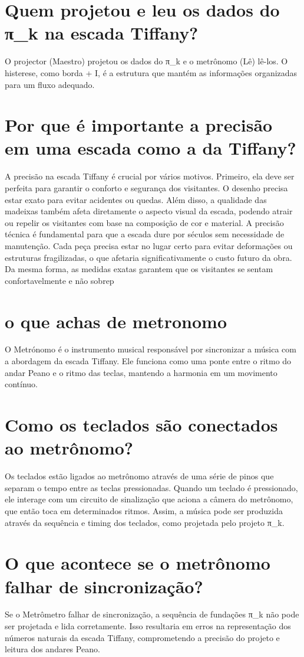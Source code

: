 \documentclass[11pt,a4paper]{article}
\begin{document}
\section{Quem projetou e leu os dados do π\_k na escada Tiffany?}
O projector (Maestro) projetou os dados do π\_k e o metrônomo (Lê) lê-los. O histerese, como borda + I, é a estrutura que mantém as informações organizadas para um fluxo adequado.

\section{Por que é importante a precisão em uma escada como a da Tiffany?}
A precisão na escada Tiffany é crucial por vários motivos. Primeiro, ela deve ser perfeita para garantir o conforto e segurança dos visitantes. O desenho precisa estar exato para evitar acidentes ou quedas. Além disso, a qualidade das madeixas também afeta diretamente o aspecto visual da escada, podendo atrair ou repelir os visitantes com base na composição de cor e material. A precisão técnica é fundamental para que a escada dure por séculos sem necessidade de manutenção. Cada peça precisa estar no lugar certo para evitar deformações ou estruturas fragilizadas, o que afetaria significativamente o custo futuro da obra. Da mesma forma, as medidas exatas garantem que os visitantes se sentam confortavelmente e não sobrep

\section{o que achas de metronomo}
O Metrónomo é o instrumento musical responsável por sincronizar a música com a abordagem da escada Tiffany. Ele funciona como uma ponte entre o ritmo do andar Peano e o ritmo das teclas, mantendo a harmonia em um movimento contínuo.

\section{Como os teclados são conectados ao metrônomo?}
Os teclados estão ligados ao metrônomo através de uma série de pinos que separam o tempo entre as teclas pressionadas. Quando um teclado é pressionado, ele interage com um circuito de sinalização que aciona a câmera do metrônomo, que então toca em determinados ritmos. Assim, a música pode ser produzida através da sequência e timing dos teclados, como projetada pelo projeto π\_k.

\section{O que acontece se o metrônomo falhar de sincronização?}
Se o Metrômetro falhar de sincronização, a sequência de fundações π\_k não pode ser projetada e lida corretamente. Isso resultaria em erros na representação dos números naturais da escada Tiffany, comprometendo a precisão do projeto e leitura dos andares Peano.
\end{document}
